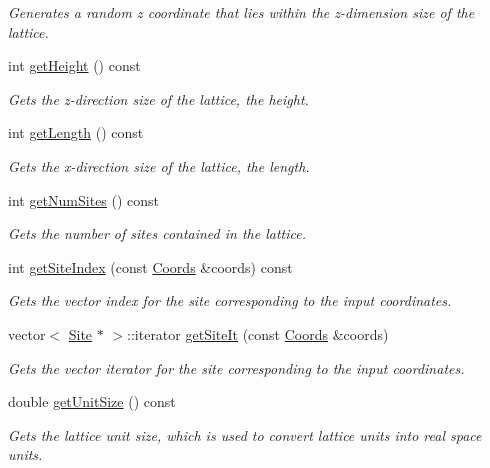 \begin{DoxyCompactItemize}
\begin{DoxyCompactList}\small\item\em Generates a random z coordinate that lies within the z-\/dimension size of the lattice. \end{DoxyCompactList}\item 
int \hyperlink{class_lattice_aaa0cba3ab33ac620d9b9f9508c56d1ac}{get\+Height} () const
\begin{DoxyCompactList}\small\item\em Gets the z-\/direction size of the lattice, the height. \end{DoxyCompactList}\item 
int \hyperlink{class_lattice_a4b43b67a36fcd3dfe62c9eeaffa561d2}{get\+Length} () const
\begin{DoxyCompactList}\small\item\em Gets the x-\/direction size of the lattice, the length. \end{DoxyCompactList}\item 
int \hyperlink{class_lattice_ae8046ebe4dbbe34b03548384ae79d4ae}{get\+Num\+Sites} () const
\begin{DoxyCompactList}\small\item\em Gets the number of sites contained in the lattice. \end{DoxyCompactList}\item 
int \hyperlink{class_lattice_abafcbcee9689c0cf7a21134095075604}{get\+Site\+Index} (const \hyperlink{struct_coords}{Coords} \&coords) const
\begin{DoxyCompactList}\small\item\em Gets the vector index for the site corresponding to the input coordinates. \end{DoxyCompactList}\item 
vector$<$ \hyperlink{class_site}{Site} $\ast$ $>$\+::iterator \hyperlink{class_lattice_a46f7d12855d24e1bdd02814621b0a178}{get\+Site\+It} (const \hyperlink{struct_coords}{Coords} \&coords)
\begin{DoxyCompactList}\small\item\em Gets the vector iterator for the site corresponding to the input coordinates. \end{DoxyCompactList}\item 
double \hyperlink{class_lattice_ac6963a6b2b4b8d96d3417f6e9c2a509d}{get\+Unit\+Size} () const
\begin{DoxyCompactList}\small\item\em Gets the lattice unit size, which is used to convert lattice units into real space units. \end{DoxyCompactList}\item 

\end{DoxyCompactItemize}
